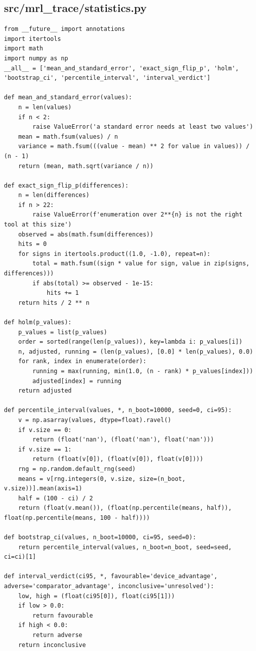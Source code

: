 \documentclass[a4paper,10pt]{article}
\begin{document}
\subsection{src/mrl\_trace/statistics.py}
\begin{Verbatim}
from __future__ import annotations
import itertools
import math
import numpy as np
__all__ = ['mean_and_standard_error', 'exact_sign_flip_p', 'holm', 'bootstrap_ci', 'percentile_interval', 'interval_verdict']

def mean_and_standard_error(values):
    n = len(values)
    if n < 2:
        raise ValueError('a standard error needs at least two values')
    mean = math.fsum(values) / n
    variance = math.fsum(((value - mean) ** 2 for value in values)) / (n - 1)
    return (mean, math.sqrt(variance / n))

def exact_sign_flip_p(differences):
    n = len(differences)
    if n > 22:
        raise ValueError(f'enumeration over 2**{n} is not the right tool at this size')
    observed = abs(math.fsum(differences))
    hits = 0
    for signs in itertools.product((1.0, -1.0), repeat=n):
        total = math.fsum((sign * value for sign, value in zip(signs, differences)))
        if abs(total) >= observed - 1e-15:
            hits += 1
    return hits / 2 ** n

def holm(p_values):
    p_values = list(p_values)
    order = sorted(range(len(p_values)), key=lambda i: p_values[i])
    n, adjusted, running = (len(p_values), [0.0] * len(p_values), 0.0)
    for rank, index in enumerate(order):
        running = max(running, min(1.0, (n - rank) * p_values[index]))
        adjusted[index] = running
    return adjusted

def percentile_interval(values, *, n_boot=10000, seed=0, ci=95):
    v = np.asarray(values, dtype=float).ravel()
    if v.size == 0:
        return (float('nan'), (float('nan'), float('nan')))
    if v.size == 1:
        return (float(v[0]), (float(v[0]), float(v[0])))
    rng = np.random.default_rng(seed)
    means = v[rng.integers(0, v.size, size=(n_boot, v.size))].mean(axis=1)
    half = (100 - ci) / 2
    return (float(v.mean()), (float(np.percentile(means, half)), float(np.percentile(means, 100 - half))))

def bootstrap_ci(values, n_boot=10000, ci=95, seed=0):
    return percentile_interval(values, n_boot=n_boot, seed=seed, ci=ci)[1]

def interval_verdict(ci95, *, favourable='device_advantage', adverse='comparator_advantage', inconclusive='unresolved'):
    low, high = (float(ci95[0]), float(ci95[1]))
    if low > 0.0:
        return favourable
    if high < 0.0:
        return adverse
    return inconclusive
\end{Verbatim}
\end{document}
